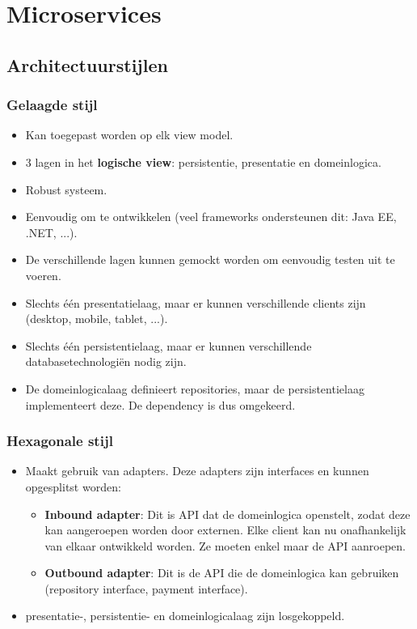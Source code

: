 \part{Microservices}
	\chapter{Architectuurstijlen}
	
	\section{Gelaagde stijl}
		\begin{itemize}
			\item[\info] Kan toegepast worden op elk view model.
			\item[\info] 3 lagen in het \textbf{logische view}: persistentie, presentatie en domeinlogica.
			\item[\good] Robust systeem.
			\item[\good] Eenvoudig om te ontwikkelen (veel frameworks ondersteunen dit: Java EE, .NET, ...).
			\item[\good] De verschillende lagen kunnen gemockt worden om eenvoudig testen uit te voeren.
			\item[\alert] Slechts één presentatielaag, maar er kunnen verschillende clients zijn (desktop, mobile, tablet, ...).
			\item[\alert] Slechts één persistentielaag, maar er kunnen verschillende databasetechnologiën nodig zijn.
			\item[\alert] De domeinlogicalaag definieert repositories, maar de persistentielaag implementeert deze. De dependency is dus omgekeerd.
		\end{itemize}
	\section{Hexagonale stijl}
		\begin{itemize}
			\item[\info] Maakt gebruik van adapters. Deze adapters zijn interfaces en kunnen opgesplitst worden:
			\begin{itemize}
				\item[\info] \textbf{Inbound adapter}: Dit is API dat de domeinlogica openstelt, zodat deze kan aangeroepen worden door externen. Elke client kan nu onafhankelijk van elkaar ontwikkeld worden. Ze moeten enkel maar de API aanroepen.
				\item[\info] \textbf{Outbound adapter}: Dit is de API die de domeinlogica kan gebruiken (repository interface, payment interface).
			\end{itemize}
			\item[\good] presentatie-, persistentie- en domeinlogicalaag zijn losgekoppeld.
		\end{itemize}
